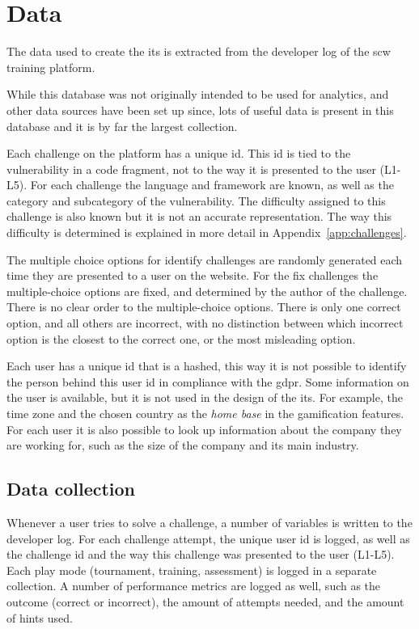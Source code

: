 \section{Data}
\label{sec:data}

The data used to create the \gls{its} is extracted from the developer log of the \gls{scw} training platform.

While this database was not originally intended to be used for analytics, and other data sources have been set up since, lots of useful data is present in this database and it is by far the largest collection. 

Each challenge on the platform has a unique \gls{id}.
This \gls{id} is tied to the \gls{vulnerability} in a code fragment, not to the way it is presented to the user (L1-L5).
For each challenge the language and framework are known, as well as the category and subcategory of the vulnerability.
The difficulty assigned to this challenge is also known but it is not an accurate representation.
The way this difficulty is determined is explained in more detail in Appendix~\ref{app:challenges}.

The multiple choice options for identify challenges are randomly generated each time they are presented to a user on the website.
For the fix challenges the multiple-choice options are fixed, and determined by the author of the challenge.
There is no clear order to the multiple-choice options.
There is only one correct option, and all others are incorrect, with no distinction between which incorrect option is the closest to the correct one, or the most misleading option.

Each user has a unique \gls{id} that is a hashed, this way it is not possible to identify the person behind this user \gls{id} in compliance with the \gls{gdpr}.
Some information on the user is available, but it is not used in the design of the \gls{its}.
For example, the time zone and the chosen country as the \textit{home base} in the gamification features.
For each user it is also possible to look up information about the company they are working for, such as the size of the company and its main industry.

\subsection{Data collection}
Whenever a user tries to solve a challenge, a number of variables is written to the developer log.
For each challenge attempt, the unique user \gls{id} is logged, as well as the challenge \gls{id} and the way this challenge was presented to the user (L1-L5).
Each play mode (tournament, training, assessment) is logged in a separate collection.
A number of performance metrics are logged as well, such as the outcome (correct or incorrect), the amount of attempts needed, and the amount of hints used.


